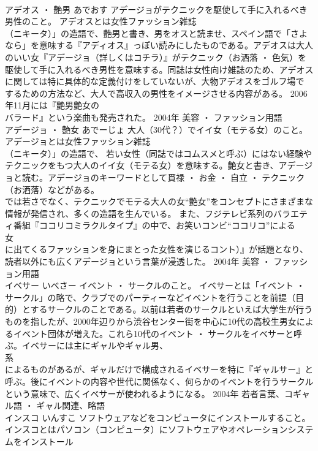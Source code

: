 \documentclass[8pt]{extreport}
\begin{document}
\begin{CJK}{UTF8}{min}
\\	アデオス ・ 艶男	あでおす	アデージョがテクニックを駆使して手に入れるべき男性のこと。	アデオスとは女性ファッション雑誌
\\	（ニキータ）」の造語で、艶男と書き、男をオスと読ませ、スペイン語で「さよなら」を意味する『アディオス』っぽい読みにしたものである。アデオスは大人のいい女『アデージョ（詳しくはコチラ）』がテクニック（お洒落 ・ 色気）を駆使して手に入れるべき男性を意味する。同誌は女性向け雑誌のため、アデオスに関しては特に具体的な定義付けをしていないが、大物アデオスをゴルフ場で
\\	するための方法など、大人で高収入の男性をイメージさせる内容がある。 2006年11月には『艶男艶女の
\\	バラード』という楽曲も発売された。	2004年	美容 ・ ファッション用語	
\\	アデージョ ・ 艶女	あでーじょ	大人（30代？）でイイ女（モテる女）のこと。	アデージョとは女性ファッション雑誌
\\	（ニキータ）」の造語で、 若い女性（同誌ではコムスメと呼ぶ）にはない経験やテクニックをもつ大人のイイ女（モテる女）を意味する。艶女と書き、アデージョと読む。アデージョのキーワードとして貫禄 ・ お金 ・ 自立 ・ テクニック（お洒落）などがある。
\\	では若さでなく、テクニックでモテる大人の女“艶女”をコンセプトにさまざまな情報が発信され、多くの造語を生んでいる。 また、フジテレビ系列のバラエティ番組『ココリコミラクルタイプ』の中で、お笑いコンビ“ココリコ”による
\\	女
\\	に出てくるファッションを身にまとった女性を演じるコント）』が話題となり、
\\	読者以外にも広くアデージョという言葉が浸透した。	2004年	美容 ・ ファッション用語	
\\	イベサー	いべさー	イベント ・ サークルのこと。	イベサーとは「イベント ・ サークル」の略で、クラブでのパーティーなどイベントを行うことを前提（目的）とするサークルのことである。以前は若者のサークルといえば大学生が行うものを指したが、2000年辺りから渋谷センター街を中心に10代の高校生男女によるイベント団体が増えた。これら10代のイベント ・ サークルをイベサーと呼ぶ。イベサーには主にギャルやギャル男、
\\	系
\\	によるものがあるが、ギャルだけで構成されるイベサーを特に『ギャルサー』と呼ぶ。後にイベントの内容や世代に関係なく、何らかのイベントを行うサークルという意味で、広くイベサーが使われるようになる。	2004年	若者言葉、コギャル語 ・ ギャル関連、略語	
\\	インスコ	いんすこ	ソフトウェアなどをコンピュータにインストールすること。	インスコとはパソコン（コンピュータ）にソフトウェアやオペレーションシステムをインストール

\end{CJK}
\end{document}
